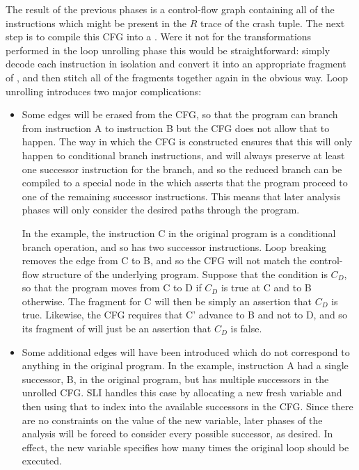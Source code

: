 The result of the previous phases is a control-flow graph containing all of the instructions which might be present in the $R$ trace of the crash tuple.
The next step is to compile this CFG into a \StateMachine.
Were it not for the transformations performed in the loop unrolling phase this would be straightforward: simply decode each instruction in isolation and convert it into an appropriate fragment of \StateMachine, and then stitch all of the fragments together again in the obvious way.
Loop unrolling introduces two major complications:

\begin{itemize}
\item
  Some edges will be erased from the CFG, so that the program can branch from instruction A to instruction B but the CFG does not allow that to happen.
  The way in which the CFG is constructed ensures that this will only happen to conditional branch instructions, and will always preserve at least one successor instruction for the branch, and so the reduced branch can be compiled to a special  node in the \StateMachine which asserts that the program proceed to one of the remaining successor instructions.
  This means that later analysis phases will only consider the desired paths through the program.

  In the example, the instruction C in the original program is a conditional branch operation, and so has two successor instructions.
  Loop breaking removes the edge from C to B, and so the CFG will not match the control-flow structure of the underlying program.
  Suppose that the condition is $C_D$, so that the program moves from C to D if $C_D$ is true at C and to B otherwise.
  The \StateMachine fragment for C will then be simply an assertion that $C_D$ is true.
  Likewise, the CFG requires that C' advance to B and not to D, and so its fragment of \StateMachine will just be an assertion that $C_D$ is false.

\item
  Some additional edges will have been introduced which do not correspond to anything in the original program.
  In the example, instruction A had a single successor, B, in the original program, but has multiple successors in the unrolled CFG.
  SLI handles this case by allocating a new fresh variable and then using that to index into the available successors in the CFG.
  Since there are no constraints on the value of the new variable, later phases of the analysis will be forced to consider every possible successor, as desired.
  In effect, the new variable specifies how many times the original loop should be executed.
\end{itemize}

